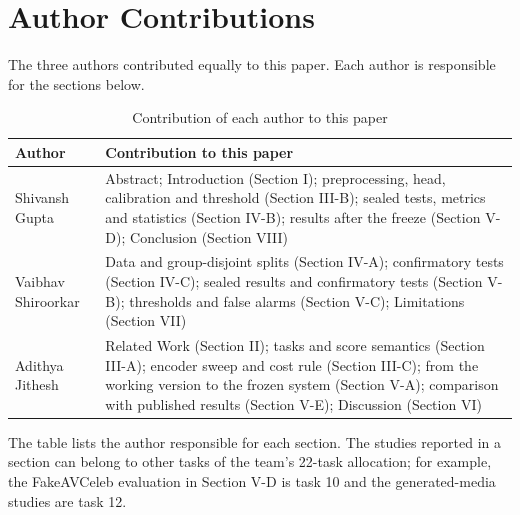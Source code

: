 \documentclass[conference,a4paper]{IEEEtran_nodash}
\begin{document}
\section*{Author Contributions}
The three authors contributed equally to this paper. Each author is responsible for the sections below.
\begin{table}[H]
\centering
\caption{Contribution of each author to this paper}
\label{tab:contrib}
\footnotesize
\renewcommand{\arraystretch}{1.15}
\begin{tabular}{@{}L{1.7cm}L{6.5cm}@{}}
\toprule
Author & Contribution to this paper \\
\midrule
Shivansh Gupta & Abstract; Introduction (Section I); preprocessing, head, calibration and threshold (Section III-B); sealed tests, metrics and statistics (Section IV-B); results after the freeze (Section V-D); Conclusion (Section VIII) \\
Vaibhav Shiroorkar & Data and group-disjoint splits (Section IV-A); confirmatory tests (Section IV-C); sealed results and confirmatory tests (Section V-B); thresholds and false alarms (Section V-C); Limitations (Section VII) \\
Adithya Jithesh & Related Work (Section II); tasks and score semantics (Section III-A); encoder sweep and cost rule (Section III-C); from the working version to the frozen system (Section V-A); comparison with published results (Section V-E); Discussion (Section VI) \\
\bottomrule
\end{tabular}
\par\smallskip
\raggedright\scriptsize The table lists the author responsible for each section. The
studies reported in a section can belong to other tasks of the team's 22-task
allocation; for example, the FakeAVCeleb evaluation in Section V-D is task 10 and the
generated-media studies are task 12.
\end{table}



\end{document}
